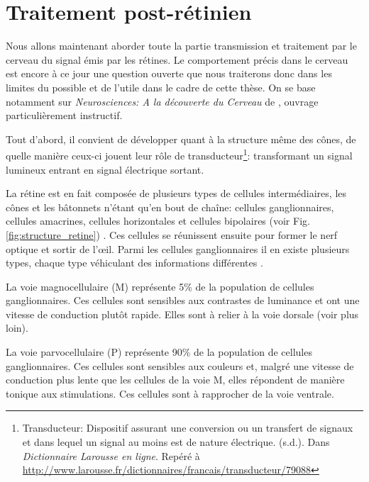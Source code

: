 	\section{Traitement post-rétinien}
	\par Nous allons maintenant aborder toute la partie transmission et traitement par le cerveau du signal émis par les rétines. Le comportement précis dans le cerveau est encore à ce jour une question ouverte que nous traiterons donc dans les limites du possible et de l'utile dans le cadre de cette thèse. On se base notamment sur \textit{Neurosciences: A la découverte du Cerveau} de \citep{bear_neurosciences:_2007}, ouvrage particulièrement instructif.
	
	\par Tout d'abord, il convient de développer quant à la structure même des cônes, de quelle manière ceux-ci jouent leur rôle de transducteur\footnote{Transducteur: Dispositif assurant une conversion ou un transfert de signaux et dans lequel un signal au moins est de nature électrique. (s.d.). Dans \textit{Dictionnaire Larousse en ligne}. Repéré à \url{http://www.larousse.fr/dictionnaires/francais/transducteur/79088}}: transformant un signal lumineux entrant en signal électrique sortant.
	
	\par La rétine est en fait composée de plusieurs types de cellules intermédiaires, les cônes et les bâtonnets n'étant qu'en bout de chaîne: cellules ganglionnaires, cellules amacrines, cellules horizontales et cellules bipolaires (voir Fig. \ref{fig:structure_retine}) \citep{bear_neurosciences:_2007}. Ces cellules se réunissent ensuite pour former le nerf optique et sortir de l'œil. Parmi les cellules ganglionnaires il en existe plusieurs types, chaque type véhiculant des informations différentes \citep{anses_effets_2014}.
	
	\par La voie magnocellulaire (M) représente 5\% de la population de cellules ganglionnaires. Ces cellules sont sensibles aux contrastes de luminance et ont une vitesse de conduction plutôt rapide. Elles sont à relier à la voie dorsale (voir plus loin).
	
	\par La voie parvocellulaire (P) représente 90\% de la population de cellules ganglionnaires. Ces cellules sont sensibles aux couleurs et, malgré une vitesse de conduction plus lente que les cellules de la voie M, elles répondent de manière tonique aux stimulations. Ces cellules sont à rapprocher de la voie ventrale.
	

